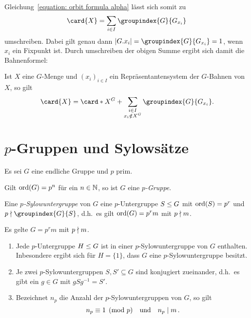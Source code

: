 Gleichung~\eqref{equation: orbit formula alpha} lässt sich somit zu
\[
    \card{X}
  = \sum_{i \in I} \groupindex{G}{G_{x_i}} \,
\]
umschreiben.
Dabei gilt genau dann $|G.x_i| = \groupindex{G}{G_{x_i}} = 1$, wenn $x_i$ ein Fixpunkt ist.
Durch umschreiben der obigen Summe ergibt sich damit die Bahnenformel:

\begin{corollary}[Bahnenformel]
  Ist $X$ eine $G$-Menge und $(x_i)_{i \in I}$ ein Repräsentantensystem der $G$-Bahnen von $X$, so gilt
  \[
      \card{X}
    =   \card*{X^G}
      + \sum_{\substack{i \in I \\ x_i \notin X^G}} \groupindex{G}{G_{x_i}}.
  \]

\end{corollary}





\section{\texorpdfstring{$p$}{p}-Gruppen und Sylowsätze}

Es sei $G$ eine endliche Gruppe und $p$ prim.

\begin{definition}
  Gilt $\operatorname{ord}(G) = p^n$ für ein $n \in \mathbb{N}$, so ist $G$ eine \emph{$p$-Gruppe}.
\end{definition}

\begin{definition}
  Eine \emph{$p$-Sylow\-unter\-gruppe} von $G$ eine $p$-Untergruppe $S \mathrel{\leq} G$ mit $\operatorname{ord}(S) = p^r$ und $p \notdivides \groupindex{G}{S}$, d.h.\ es gilt $\operatorname{ord}(G) = p^r m$ mit $p \mathrel{\nmid} m$.
\end{definition}

\begin{theorem}[Sylowsätze]
  Es gelte $G = p^r m$ mit $p \mathrel{\nmid} m$.
  \begin{enumerate}
    \item
      Jede $p$-Untergruppe $H \mathrel{\leq} G$ ist in einer $p$-Sylowuntergruppe von $G$ enthalten.
      Inbesondere ergibt sich für $H = \{1\}$, dass $G$ eine $p$-Sylowuntergruppe besitzt.
    \item
      Je zwei $p$-Sylowuntergruppen $S, S' \subseteq G$ sind konjugiert zueinander, d.h.\ es gibt ein $g \in G$ mit $g S g^{-1} = S'$.
    \item
      Bezeichnet $n_p$ die Anzahl der $p$-Sylowuntergruppen von $G$, so gilt
      \[
                n_p
        \equiv  1
        \pmod{p}
        \quad\text{und}\quad
        n_p \mathrel{|} m \,.
      \]

  \end{enumerate}
\end{theorem}



